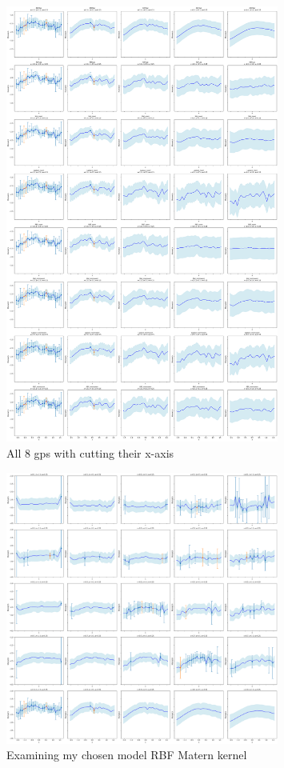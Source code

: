 \documentclass{article}
\begin{document}
\begin{figure}[H]
    \centering
    \includegraphics[width=0.8\textwidth]{LatexPlots/final_gps_plots/final_gps_xcuts.png}
    \caption{All 8 gps with cutting their x-axis}
    \label{fig:best8_xcuts}
\end{figure}

\begin{figure}[H]
    \centering
    \includegraphics[width=0.8\textwidth]{LatexPlots/final_gps_plots/gps_rbfmatern_xcuts.png}
    \caption{Examining my chosen model RBF Matern kernel}
    \label{fig:RBF_Matern_xcuts}
\end{figure}
\end{document}
